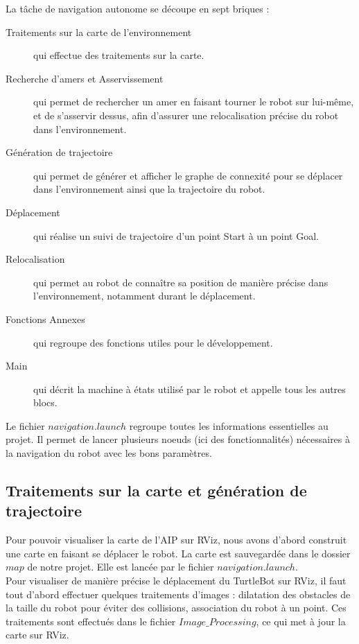 \documentclass[10pt,a4paper]{article}
\begin{document}
La tâche de navigation autonome se découpe en sept briques : 
\begin{description}
\item [Traitements sur la carte de l'environnement] qui effectue des traitements sur la carte.
\item [Recherche d'amers et Asservissement] qui permet de rechercher un amer en faisant tourner le robot sur lui-même, et de s'asservir dessus, afin d'assurer une relocalisation précise du robot dans l'environnement.
\item [Génération de trajectoire] qui permet de générer et afficher le graphe de connexité pour se déplacer dans l'environnement ainsi que la trajectoire du robot.
\item [Déplacement] qui réalise un suivi de trajectoire d'un point Start à un point Goal.
\item [Relocalisation] qui permet au robot de connaître sa position de manière précise dans l'environnement, notamment durant le déplacement.
\item [Fonctions Annexes] qui regroupe des fonctions utiles pour le développement.
\item [Main] qui décrit la machine à états utilisé par le robot et appelle tous les autres blocs.
\end{description}


Le fichier $navigation.launch$ regroupe toutes les informations essentielles au projet. Il permet de lancer plusieurs noeuds (ici des fonctionnalités) nécessaires à la navigation du robot avec les bons paramètres.


\subsection{Traitements sur la carte et génération de trajectoire}
\label{sec:traitements}

Pour pouvoir visualiser la carte de l'AIP sur RViz, nous avons d'abord construit une carte en faisant se déplacer le robot. La carte est sauvegardée dans le dossier $map$ de notre projet. Elle est lancée par le fichier $navigation.launch$.\\

Pour visualiser de manière précise le déplacement du TurtleBot sur RViz, il faut tout d'abord effectuer quelques traitements d'images : dilatation des obstacles de la taille du robot pour éviter des collisions, association du robot à un point. Ces traitements sont effectués dans le fichier $Image\_Processing$, ce qui met à jour la carte sur RViz.\\
\end{document}
